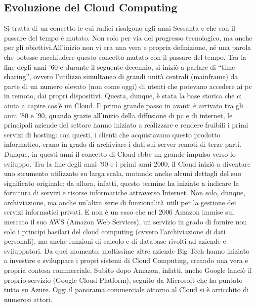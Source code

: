 \subsection{Evoluzione del Cloud Computing} 
\cite{storia_cloud}
Si tratta di un concetto le cui radici risalgono agli anni Sessanta e che con il passare del tempo è mutato. Non solo per via del progresso tecnologico, ma anche per gli obiettivi.All’inizio non vi era una vera e propria definizione, né una parola che potesse racchiudere questo concetto mutato con il passare del tempo. Tra la fine degli anni ’60 e durante il seguente decennio, si iniziò a parlare di “time-sharing”, ovvero l’utilizzo simultaneo di grandi unità centrali (mainframe) da parte di un numero elevato (non come oggi) di utenti che potevano accedere ai pc in remoto, dai propri dispositivi.
Questa, dunque, è stata la base storica che ci aiuta a capire cos'è un Cloud. Il primo grande passo in avanti è arrivato tra gli anni ’80 e ’90, quando grazie all’inizio della diffusione di pc e di internet, le principali aziende del settore hanno iniziato a realizzare e rendere fruibili i primi servizi di hosting: con questi, i clienti che acquistavano questo prodotto informatico, erano in grado di archiviare i dati sui server remoti di terze parti. Dunque, in questi anni il concetto di Cloud ebbe un grande impulso verso lo sviluppo.
Tra la fine degli anni ’90 e i primi anni 2000, il Cloud iniziò a diventare uno strumento utilizzato su larga scala, mutando anche alcuni dettagli del suo significato originale: da allora, infatti, questo termine ha iniziato a indicare la fornitura di servizi e risorse informatiche attraverso Internet. Non solo, dunque, archiviazione, ma anche un’altra serie di funzionalità utili per la gestione dei servizi informatici privati. E non è un caso che nel 2006 Amazon immise sul mercato il suo AWS (Amazon Web Services), un servizio in grado di fornire non solo i principi basilari del cloud computing (ovvero l’archiviazione di dati personali), ma anche funzioni di calcolo e di database rivolti ad aziende e sviluppatori. Da quel momento, moltissime altre aziende Big Tech hanno iniziato a investire e sviluppare i propri sistemi di Cloud Computing, creando una vera e propria contesa commerciale. Subito dopo Amazon, infatti, anche Google lanciò il proprio servizio (Google Cloud Platform), seguito da Microsoft che ha puntato tutto su Azure. Oggi,il panorama commerciale attorno al Cloud si è arricchito di numerosi attori.
